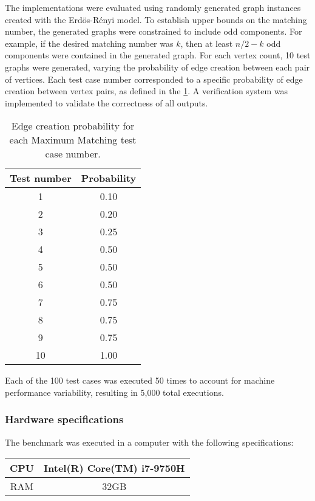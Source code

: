 The implementations were evaluated using randomly generated graph instances created with the Erd\"os-R\'enyi model. 
To establish upper bounds on the matching number, the generated graphs were constrained to include odd components. 
For example, if the desired matching number was \(k\), then at least \(n/2 - k\) odd components were contained in the generated graph.
For each vertex count, 10 test graphs were generated, varying the probability of edge creation between each pair of vertices. 
Each test case number corresponded to a specific probability of edge creation between vertex pairs, as defined in the \cref{tab:edge_max}. 
A verification system was implemented to validate the correctness of all outputs.
\begin{table}[H]
  \centering
  \begin{tabular}{|c|c|}
    \hline
    Test number & Probability \\
    \hline
    1 & 0.10 \\
    2 & 0.20 \\
    3 & 0.25 \\
    4 & 0.50 \\
    5 & 0.50 \\
    6 & 0.50 \\
    7 & 0.75 \\
    8 & 0.75 \\
    9 & 0.75 \\
    10 & 1.00 \\
    \hline
  \end{tabular}
  \caption{Edge creation probability for each Maximum Matching test case number.}
  \label{tab:edge_max}
\end{table}
Each of the 100 test cases was executed 50 times to account for machine performance variability, resulting in 5,000 total executions.

\subsubsection{Hardware specifications}

\noindent
The benchmark was executed in a computer with the following specifications:

\begin{center}
  \begin{tabular}{|c|c|}
    \hline
    CPU & Intel(R) Core(TM) i7-9750H \\
    \hline
    RAM & 32GB \\ 
    \hline
  \end{tabular}
\end{center}

